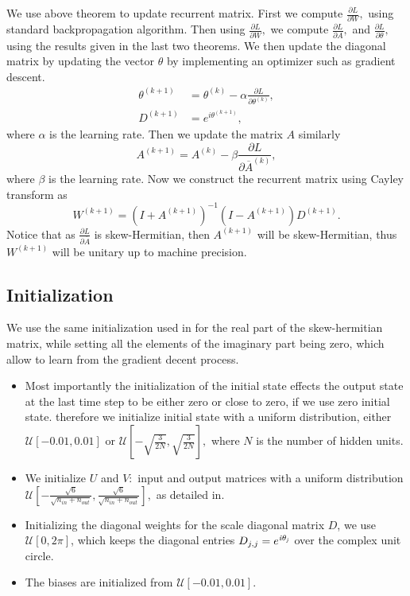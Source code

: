 \documentclass[letterpaper]{article} %
\begin{document}
\noindent We use above theorem to update recurrent matrix. First we compute $\frac{\partial L}{\partial W},$ using standard backpropagation algorithm. Then using $\frac{\partial L}{\partial W},$ we compute $\frac{\partial L}{\partial A},$ and $\frac{\partial L}{\partial \theta},$ using the results given in the last two theorems. We then update the diagonal matrix by updating the vector $\theta$ by implementing an optimizer such as gradient descent.
\begin{align*}
 \theta^{(k+1)} &= \theta^{(k)} - \alpha \frac{\partial L}{\partial \theta^{(k)}}, \\
 D^{(k+1)}&=e^{i\theta^{(k+1)}},
\end{align*}
where $\alpha$ is the learning rate. Then we update the matrix $A$ similarly
$$ A^{(k+1)} =A^{(k)} -\beta \frac{\partial L}{\partial \overline{A}^{(k)}} ,$$
where $\beta$  is the learning rate. Now we construct the recurrent matrix using Cayley transform as
$$ W^{(k+1)}  = (I+A^{(k+1)})^{-1}(I-A^{(k+1)})D^{(k+1)}.$$
Notice that as $\frac{\partial L}{\partial \overline{A}}$ is skew-Hermitian, then $A^{(k+1)}$ will be skew-Hermitian, thus $W^{(k+1)}$ will be unitary up to machine precision.

  
\subsection{Initialization}

\noindent We use the same initialization used in \cite{kyle17} for the real part of the skew-hermitian matrix, while setting all the elements of the imaginary part being zero, which allow to learn from the gradient decent process. 

\begin{itemize}
\item Most importantly the initialization of the initial state effects the output state at the last time step to be either zero or close to zero, if we use zero initial state. therefore we initialize initial state with a uniform distribution, either $\mathcal{U}\left[ -0.01,0.01 \right]$ or $\mathcal{U}\left[ -\sqrt{\frac{3}{2N}},\sqrt{\frac{3}{2N}} \right],$ where $N$ is the number of hidden units.
\item We initialize $U$ and $V:$ input and output matrices with a uniform distribution \\ $\mathcal{U}\left[ - \frac{\sqrt{6}}{\sqrt{n_{in}+n_{out}}},\frac{\sqrt{6}}{\sqrt{n_{in}+n_{out}}} \right],$ as detailed in\cite{Glorot10}.
\item Initializing the diagonal weights for the scale diagonal matrix $D$, we use $\mathcal{U}\left[ 0,2\pi \right]$, which keeps the diagonal entries $D_{j,j}=e^{\it{i}\theta_j}$ over the complex unit circle.
\item The biases are initialized from $\mathcal{U}\left[ -0.01,0.01 \right].$


\end{itemize}
\end{document}
